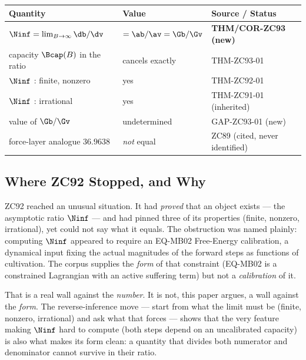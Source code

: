 \documentclass[12pt, a4paper]{article}
\begin{document}
\begin{keybox}[title={Numerical Summary --- ZC93 (T-canonical)}]
{\footnotesize\renewcommand{\arraystretch}{1.3}
\begin{center}
\begin{tabular}{@{}p{5.8cm}p{3.0cm}p{3.4cm}@{}}
\toprule
\textbf{Quantity} & \textbf{Value} & \textbf{Source / Status} \\
\midrule
$\Ninf=\lim_{B\to\infty}\db/\dv$
  & $=\ab/\av=\Gb/\Gv$
  & \textbf{THM/COR-ZC93 (new)} \\
capacity $\Bcap(B)$ in the ratio
  & cancels exactly
  & THM-ZC93-01 \\
$\Ninf$ : finite, nonzero
  & yes
  & THM-ZC92-01 \\
$\Ninf$ : irrational
  & yes
  & THM-ZC91-01 (inherited) \\
value of $\Gb/\Gv$
  & undetermined
  & GAP-ZC93-01 (new) \\
force-layer analogue $36.9638$
  & \emph{not} equal
  & ZC89 (cited, never identified) \\
\bottomrule
\end{tabular}
\end{center}}
\end{keybox}

\subsection{Where ZC92 Stopped, and Why}

ZC92 reached an unusual situation. It had \emph{proved} that an object exists
--- the asymptotic ratio $\Ninf$ --- and had pinned three of its properties
(finite, nonzero, irrational), yet could not say what it equals. The
obstruction was named plainly: computing $\Ninf$ appeared to require an
EQ-MB02 Free-Energy calibration, a dynamical input fixing the actual
magnitudes of the forward steps as functions of cultivation. The corpus
supplies the \emph{form} of that constraint (EQ-MB02 is a constrained
Lagrangian with an active suffering term) but not a \emph{calibration} of it.

That is a real wall against the \emph{number}. It is not, this paper argues, a
wall against the \emph{form}. The reverse-inference move --- start from what
the limit must be (finite, nonzero, irrational) and ask what that forces ---
shows that the very feature making $\Ninf$ hard to compute (both steps depend
on an uncalibrated capacity) is also what makes its form clean: a quantity
that divides both numerator and denominator cannot survive in their ratio.
\end{document}
